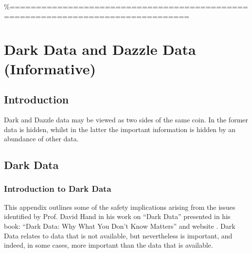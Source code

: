 \%================================================================================
%
%
\section{Dark Data and Dazzle Data (Informative)}%
\label{bkm:darkdazzledata}
%

\subsection{Introduction}
Dark and Dazzle data may be viewed as two sides of the same coin. In the former data is hidden, whilst in the latter the important \gls{information} is hidden by an abundance of other data.

\subsection{Dark Data}%
%
\label{bkm:darkdata}
%
\subsubsection{Introduction to Dark Data}
This appendix outlines some of the safety implications arising from the issues identified by Prof. David Hand in his work on ``Dark Data'' presented in his book: ``Dark Data: Why What You Don't Know Matters'' \cite{citation:darkdata:hand} and website \cite{citation:darkdata:website}. Dark Data relates to data that is not available, but nevertheless is important, and indeed, in some cases, more important than the data that is available.

